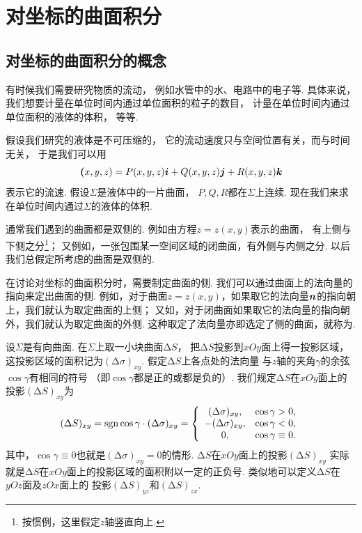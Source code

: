 \section{对坐标的曲面积分}
\subsection{对坐标的曲面积分的概念}
有时候我们需要研究物质的流动，
例如水管中的水、电路中的电子等.
具体来说，我们想要计量在单位时间内通过单位面积的粒子的数目，
计量在单位时间内通过单位面积的液体的体积，
等等.

假设我们研究的液体是不可压缩的，
它的流动速度只与空间位置有关，而与时间无关，
于是我们可以用\begin{equation*}
	\boldsymbol(x,y,z)
	= P(x,y,z)\boldsymbol{i}+Q(x,y,z)\boldsymbol{j}+R(x,y,z)\boldsymbol{k}
\end{equation*}表示它的流速.
假设\(\Sigma\)是液体中的一片曲面，
\(P,Q,R\)都在\(\Sigma\)上连续.
现在我们来求在单位时间内通过\(\Sigma\)的液体的体积.

通常我们遇到的曲面都是双侧的.
例如由方程\(z = z(x,y)\)表示的曲面，
有上侧与下侧之分\footnote{按惯例，这里假定\(z\)轴竖直向上.}；
又例如，一张包围某一空间区域的闭曲面，有外侧与内侧之分.
以后我们总假定所考虑的曲面是双侧的.

在讨论对坐标的曲面积分时，需要制定曲面的侧.
我们可以通过曲面上的法向量的指向来定出曲面的侧.
例如，对于曲面\(z = z(x,y)\)，如果取它的法向量\(\boldsymbol{n}\)的指向朝上，我们就认为取定曲面的上侧；
又如，对于闭曲面如果取它的法向量的指向朝外，我们就认为取定曲面的外侧.
这种取定了法向量亦即选定了侧的曲面，就称为.

设\(\Sigma\)是有向曲面.
在\(\Sigma\)上取一小块曲面\(\increment S\)，
把\(\increment S\)投影到\(xOy\)面上得一投影区域，
这投影区域的面积记为\((\increment\sigma)_{xy}\).
假定\(\increment S\)上各点处的法向量
与\(z\)轴的夹角\(\gamma\)的余弦\(\cos\gamma\)有相同的符号
（即\(\cos\gamma\)都是正的或都是负的）.
我们规定\(\increment S\)在\(xOy\)面上的投影\((\increment S)_{xy}\)为\begin{equation*}
	(\Delta S)_{xy}
	= \operatorname{sgn}\cos\gamma \cdot (\Delta \sigma)_{xy}
	= \left\{ \begin{array}{cc}
	(\Delta \sigma)_{xy}, & \cos\gamma > 0, \\
	-(\Delta \sigma)_{xy}, & \cos\gamma < 0, \\
	0, & \cos\gamma \equiv 0.
	\end{array} \right.
\end{equation*}
其中，\(\cos\gamma \equiv 0\)也就是\((\increment \sigma)_{xy} = 0\)的情形.
\(\increment S\)在\(xOy\)面上的投影\((\increment S)_{xy}\)
实际就是\(\increment S\)在\(xOy\)面上的投影区域的面积附以一定的正负号.
类似地可以定义\(\increment S\)在\(yOz\)面及\(zOx\)面上的
投影\((\increment S)_{yz}\)和\((\increment S)_{zx}\).


